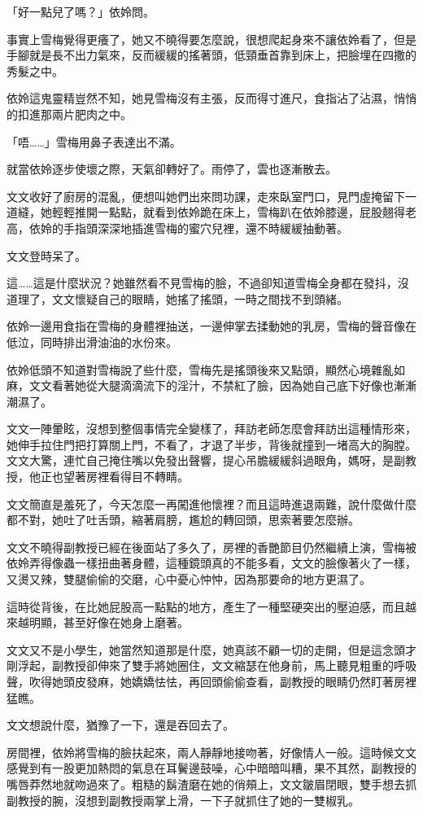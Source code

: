 「好一點兒了嗎？」依姈問。

事實上雪梅覺得更癢了，她又不曉得要怎麼說，很想爬起身來不讓依姈看了，但是手腳就是長不出力氣來，反而緩緩的搖著頭，低頸垂首靠到床上，把臉埋在四撒的秀髮之中。

依姈這鬼靈精豈然不知，她見雪梅沒有主張，反而得寸進尺，食指沾了沾濕，悄悄的扣進那兩片肥肉之中。

「唔……」雪梅用鼻子表達出不滿。

就當依姈逐步使壞之際，天氣卻轉好了。雨停了，雲也逐漸散去。

文文收好了廚房的混亂，便想叫她們出來問功課，走來臥室門口，見門虛掩留下一道縫，她輕輕推開一點點，就看到依姈跪在床上，雪梅趴在依姈膝邊，屁股翹得老高，依姈的手指頭深深地插進雪梅的蜜穴兒裡，還不時緩緩抽動著。

文文登時呆了。

這……這是什麼狀況？她雖然看不見雪梅的臉，不過卻知道雪梅全身都在發抖，沒道理了，文文懷疑自己的眼睛，她搖了搖頭，一時之間找不到頭緒。

依姈一邊用食指在雪梅的身體裡抽送，一邊伸掌去揉動她的乳房，雪梅的聲音像在低泣，同時排出滑油油的水份來。

依姈低頭不知道對雪梅說了些什麼，雪梅先是搖頭後來又點頭，顯然心境雜亂如麻，文文看著她從大腿滴滴流下的淫汁，不禁紅了臉，因為她自己底下好像也漸漸潮濕了。

文文一陣暈眩，沒想到整個事情完全變樣了，拜訪老師怎麼會拜訪出這種情形來，她伸手拉住門把打算關上門，不看了，才退了半步，背後就撞到一堵高大的胸膛。文文大驚，連忙自己掩住嘴以免發出聲響，提心吊膽緩緩斜過眼角，媽呀，是副教授，他正也望著房裡看得目不轉睛。

文文簡直是羞死了，今天怎麼一再闖進他懷裡？而且這時進退兩難，說什麼做什麼都不對，她吐了吐舌頭，縮著肩膀，尷尬的轉回頭，思索著要怎麼辦。

文文不曉得副教授已經在後面站了多久了，房裡的香艷節目仍然繼續上演，雪梅被依姈弄得像蟲一樣扭曲著身體，這種鏡頭真的不能多看，文文的臉像著火了一樣，又燙又辣，雙腿偷偷的交磨，心中憂心忡忡，因為那要命的地方更濕了。

這時從背後，在比她屁股高一點點的地方，產生了一種堅硬突出的壓迫感，而且越來越明顯，甚至好像在她身上磨著。

文文又不是小學生，她當然知道那是什麼，她真該不顧一切的走開，但是這念頭才剛浮起，副教授卻伸來了雙手將她圈住，文文縮瑟在他身前，馬上聽見粗重的呼吸聲，吹得她頭皮發麻，她嬌嬌怯怯，再回頭偷偷查看，副教授的眼睛仍然盯著房裡猛瞧。

文文想說什麼，猶豫了一下，還是吞回去了。

房間裡，依姈將雪梅的臉扶起來，兩人靜靜地接吻著，好像情人一般。這時候文文感覺到有一股更加熱悶的氣息在耳鬢邊鼓噪，心中暗暗叫糟，果不其然，副教授的嘴唇莽然地就吻過來了。粗糙的鬍渣磨在她的俏頰上，文文皺眉閉眼，雙手想去抓副教授的腕，沒想到副教授兩掌上滑，一下子就抓住了她的一雙椒乳。

